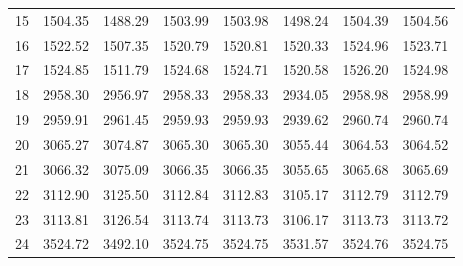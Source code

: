 \documentclass[10pt,oneside]{article}
\begin{document}
\begin{table}[h!]
\begin{tabular}{cccccccc}
15 &   1504.35 & 1488.29 & 1503.99 &    1503.98 &      1498.24 & 1504.39 &   1504.56 \\
16 &   1522.52 & 1507.35 & 1520.79 &    1520.81 &      1520.33 & 1524.96 &   1523.71 \\
17 &   1524.85 & 1511.79 & 1524.68 &    1524.71 &      1520.58 & 1526.20 &   1524.98 \\
18 &   2958.30 & 2956.97 & 2958.33 &    2958.33 &      2934.05 & 2958.98 &   2958.99 \\
19 &   2959.91 & 2961.45 & 2959.93 &    2959.93 &      2939.62 & 2960.74 &   2960.74 \\
20 &   3065.27 & 3074.87 & 3065.30 &    3065.30 &      3055.44 & 3064.53 &   3064.52 \\
21 &   3066.32 & 3075.09 & 3066.35 &    3066.35 &      3055.65 & 3065.68 &   3065.69 \\
22 &   3112.90 & 3125.50 & 3112.84 &    3112.83 &      3105.17 & 3112.79 &   3112.79 \\
23 &   3113.81 & 3126.54 & 3113.74 &    3113.73 &      3106.17 & 3113.73 &   3113.72 \\
24 &   3524.72 & 3492.10 & 3524.75 &    3524.75 &      3531.57 & 3524.76 &   3524.75 \\
\bottomrule
\end{tabular}
\end{table}
\end{document}
